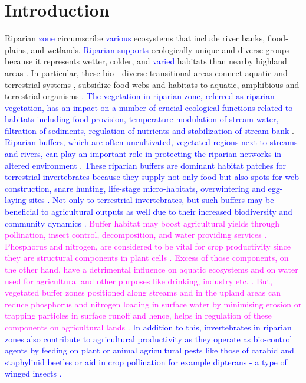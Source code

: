 \documentclass[12pt]{article}
\numberwithin{equation}{section}
\begin{document}
\section{Introduction}
Riparian \textcolor{blue} {zone} circumscribe \textcolor{blue}{various} ecosystems that include river banks, flood-plains, and wetlands. \textcolor{blue}{Riparian supports} ecologically unique and diverse groups because it represents wetter, colder, and \textcolor{blue}{varied} habitats than nearby highland areas \cite{pettit2007fire}. In particular, these bio - diverse transitional areas connect aquatic and terrestrial systems \cite{popescu2021riparian}, subsidize food webs and habitats to aquatic, amphibious and terrestrial organisms \cite{capron2020}. \textcolor{blue}{The vegetation in riparian zone, referred as riparian vegetation, has an impact on a number of crucial ecological functions related to habitats including food provision, temperature modulation of stream water, filtration of sediments, regulation of nutrients and stabilization of stream bank} \citep{hood2000, richardson2007}.\\
\textcolor{blue}{Riparian buffers, which are often uncultivated, vegetated regions next to streams and rivers, can play an important role in protecting the riparian networks in altered environment \cite{burdon2020assessing}}. \textcolor{blue}{These riparian buffers are dominant habitat patches for terrestrial invertebrates because they supply not only food but also spots for web construction, snare hunting, life-stage micro-habitats, overwintering and egg-laying sites \cite{popescu2021riparian}. Not only to terrestrial invertebrates, but such buffers may be beneficial to agricultural outputs as well due to their increased biodiversity and community dynamics \cite{forio2020small}.} \textcolor{magenta}{Buffer habitat may boost agricultural yields through pollination, insect control, decomposition, and water providing services \cite{luke2019}.} \textcolor{magenta}{Phosphorus and nitrogen, are considered to be vital for crop productivity since they are structural components in plant cells  \cite{sharma2017}. Excess of those components, on the other hand, have a detrimental influence on aquatic ecosystems and on water used for agricultural and other purposes like drinking, industry etc. \cite{carpenter1998}. But, vegetated buffer zones positioned along streams and in the upland areas can reduce phosphorus and nitrogen loading in surface water by minimising erosion or trapping particles in surface runoff and hence, helps in regulation of these components on agricultural lands \cite{vought1995}.} \textcolor{blue}{In addition to this, invertebrates in riparian zones also contribute to agricultural productivity as they operate as bio-control agents by feeding on plant or animal agricultural pests like those of carabid and staphylinid beetles \cite{andersen2000long} or aid in crop pollination for example dipterans - a type of winged insects \cite{ssymank2008pollinating}.}  \\
\end{document}
